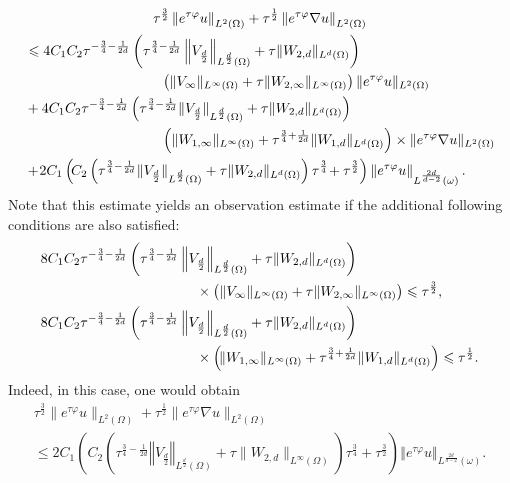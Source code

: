 \documentclass[10pt]{amsart}
\theoremstyle{definition}\newtheorem{defi}[theo]{Definition}\newtheorem{rema}[theo]{Remark}\newtheorem{exam}[theo]{Example}\newtheorem{exem}[theo]{Example}\newtheorem{nota}[theo]{Notation}
\newcommand{\norm}[1]{\left\Vert#1\right\Vert}
\renewcommand{\leq}{\leqslant}
\begin{document}
\begin{multline*}
\tau^{\frac{3}{2}} \norm{ e^{\tau \varphi} u }_{L^2(\Omega)} +
\tau^{\frac{1}{2}} \norm{e^{\tau \varphi} \nabla u }_{L^2(\Omega)}
\\
\begin{aligned}
& \leq 4C_1 C_2 \tau^{-\frac{3}{4} - \frac{1}{2d}} 
\left(\tau^{\frac{3}{4}-\frac{1}{2d}} \norm{ V_{\frac{d}{2}}}_{L^{\frac{d}{2}}(\Omega)} + \tau \| W_{2, d}\|_{L^d(\Omega)} \right)\\
&\mkern175mu
\left(\| V_\infty \|_{L^\infty(\Omega)} + \tau \| W_{2, \infty}\|_{L^\infty(\Omega)} \right)
\| e^{\tau \varphi} u \|_{L^2(\Omega)}
\\ &
 +   4 C_1 C_2 \tau^{-\frac{3}{4} - \frac{1}{2d}} 
\left( \tau^{\frac{3}{4}-\frac{1}{2d}} \| V_{\frac{d}{2}} \|_{L^{\frac{d}{2}}(\Omega)} +  \tau \| W_{2, d}\|_{L^d(\Omega)} \right)  
\\
&\mkern175mu
\left( \| W_{1,\infty} \|_{L^\infty(\Omega)} + \tau^{\frac{3}{4}+\frac{1}{2d}} \| W_{1,d} \|_{L^d(\Omega)} \right)
\times
\| e^{\tau \varphi} \nabla u \|_{L^2(\Omega)}
\\
& + \! 2 C_1\left(\! C_2 \left(\tau^{\frac{3}{4}-\frac{1}{2d}} \| V_{\frac{d}{2}} \|_{L^{\frac{d}{2}}(\Omega)} + \tau \| W_{2, d}\|_{L^d(\Omega)} \right) \tau^{\frac{3}{4}}\! + \tau^{\frac{3}{2}}\right)
\norm{e^{\tau \varphi} u}_{L^{\frac{2d}{d-2}} (\omega)}.
\end{aligned}
\end{multline*}
Note that this estimate yields an observation estimate if the additional following conditions are also satisfied:
\begin{align}
& 8 C_1 C_2 \tau^{-\frac{3}{4} - \frac{1}{2d}}
\left(\tau^{\frac{3}{4}-\frac{1}{2d}} \norm{ V_{\frac{d}{2}} }_{L^{\frac{d}{2}}(\Omega)} + \tau \| W_{2, d}\|_{L^d(\Omega)} \right)
\label{Condition-4}
\\
& \mkern200mu\times
\left(\| V_\infty \|_{L^\infty(\Omega)}+ \tau \| W_{2, \infty}\|_{L^\infty(\Omega)} \right)
\leq \tau^{\frac{3}{2}},
\notag
\\
& 8 C_1 C_2 \tau^{-\frac{3}{4} - \frac{1}{2d}}
\left(\tau^{\frac{3}{4}-\frac{1}{2d}} \norm{ V_{\frac{d}{2}}}_{L^{\frac{d}{2}}(\Omega)} + \tau \| W_{2, d}\|_{L^d(\Omega)} \right)
\label{Condition-5}
\\
& \mkern200mu\times
\left(\! \| W_{1,\infty} \|_{L^\infty(\Omega)}+\tau^{\frac{3}{4}+\frac{1}{2d}} \| W_{1,d} \|_{L^d(\Omega)} \right)
\leq \tau^{\frac{1}{2}}.\notag
\end{align}
Indeed, in this case, one would obtain
\begin{multline}\label{Carleman-General-appl-final}
\tau^{\frac{3}{2}} \| e^{\tau \varphi} u \|_{L^2(\Omega)} +
\tau^{\frac{1}{2}} \| e^{\tau \varphi} \nabla u \|_{L^2(\Omega)}\\
\leq 2 C_1\left(C_2 \left(\tau^{\frac{3}{4}-\frac{1}{2d}} \norm{ V_{\frac{d}{2}} }_{L^{\frac{d}{2}}(\Omega)} + \tau \| W_{2, d}\|_{L^\infty(\Omega)} \right) \tau^{\frac{3}{4}} + \tau^{\frac{3}{2}}\right) \norm{ e^{\tau \varphi} u}_{L^{\frac{2d}{d-2}} (\omega)}.
\end{multline}
\end{document}
